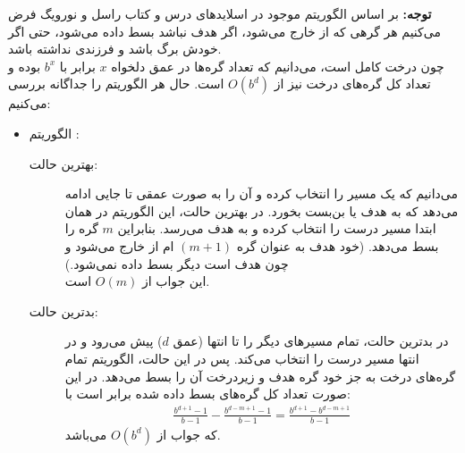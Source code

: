 \question{}

\begin{ابجد}
\item \textbf{توجه:} بر اساس الگوریتم  موجود در اسلایدهای درس و کتاب راسل و نورویگ فرض می‌کنیم هر گرهی که از  خارج می‌شود، اگر هدف نباشد بسط داده می‌شود، حتی اگر خودش برگ باشد و فرزندی نداشته باشد. \\
چون درخت کامل است، می‌دانیم که تعداد گره‌ها در عمق دلخواه $x$ برابر با $b^x$ بوده و تعداد کل گره‌های درخت نیز از $O(b^d)$ است. حال هر الگوریتم را جداگانه بررسی می‌کنیم:
\begin{itemize}
    \item الگوریتم :
          \begin{description}
              \item[بهترین حالت:] می‌دانیم که  یک مسیر را انتخاب کرده و آن را به صورت عمقی تا جایی ادامه می‌دهد که به هدف یا بن‌بست بخورد. در بهترین حالت، این الگوریتم در همان ابتدا مسیر درست را انتخاب کرده و به هدف می‌رسد. بنابراین {$m$ گره} را بسط می‌دهد. (خود هدف به عنوان گره $(m+1)$ ام از  خارج می‌شود و چون هدف است دیگر بسط داده نمی‌شود.) \\
                  این جواب از $O(m)$ است.
              \item[بدترین حالت:] در بدترین حالت،  تمام مسیرهای دیگر را تا انتها (عمق $d$) پیش می‌رود و در انتها مسیر درست را انتخاب می‌کند. پس در این حالت، الگوریتم تمام گره‌های درخت به جز خود گره هدف و زیردرخت آن را بسط می‌دهد. در این صورت تعداد کل گره‌های بسط داده شده برابر است با:
                  \begin{align*}
                      \frac{b^{d+1} - 1}{b-1} - \frac{b^{d-m+1} - 1}{b-1} = \frac{b^{d+1} - b^{d-m+1}}{b-1}
                  \end{align*}
                  که جواب از {$O(b^d)$} می‌باشد.
          \end{description}


\end{itemize}
\end{ابجد}
